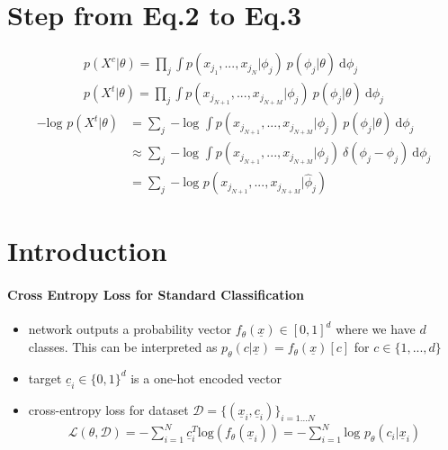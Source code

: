 \documentclass{article}
\begin{document}
	\section{Step from Eq.2 to Eq.3}
	\begin{align}
		p(X^{c} \vert \theta) = \prod_{j} \int p( x_{j_1},..., x_{j_N} \vert \phi_j) \: p(\phi_j \vert \theta) \: \text{d} \phi_j \\
		p(X^{t} \vert \theta) = \prod_{j} \int p( x_{j_{N+1}},..., x_{j_{N+M}} \vert \phi_j) \: p(\phi_j \vert \theta) \: \text{d} \phi_j
	\end{align}
	\begin{align}
		- \text{log } p(X^{t} \vert \theta) &= \sum_j - \text{log } \int p( x_{j_{N+1}},..., x_{j_{N+M}} \vert \phi_j) \: p(\phi_j \vert \theta) \: \text{d} \phi_j \\
		&\approx \sum_j - \text{log } \int p( x_{j_{N+1}},..., x_{j_{N+M}} \vert \phi_j) \: \delta(\phi_j - \hat{\phi}_j) \: \text{d} \phi_j \\
		&= \sum_j - \text{log } p( x_{j_{N+1}},..., x_{j_{N+M}} \vert \hat{\phi}_j) 
	\end{align}
	
	\section{Introduction}
	\paragraph{Cross Entropy Loss for Standard Classification}
	\begin{itemize}
		\item network outputs a probability vector $f_{\theta}(\underline{x}) \in [0,1]^{d}$ where we have $d$ classes. This can be interpreted as $p_{\theta}(c \vert {\underline{x}}) = f_{\theta}(\underline{x})[c]$ for $c \in \{1, ..., d\}$
		\item target $\underline{c}_i \in \{0,1\}^d$ is a one-hot encoded vector 
		\item cross-entropy loss for dataset $\mathcal{D} = \{(\underline{x}_i, \underline{c}_i)\}_{i=1...N}$  
		\begin{align*}
			\mathcal{L}(\theta, \mathcal{D}) = - \sum_{i=1}^{N} \underline{c}_i^T \text{log}(f_{\theta}(\underline{x}_i)) = - \sum_{i=1}^{N} \text{log } p_{\theta}(c_i \vert \underline{x}_i)
		\end{align*}
	\end{itemize}

	
\end{document}

